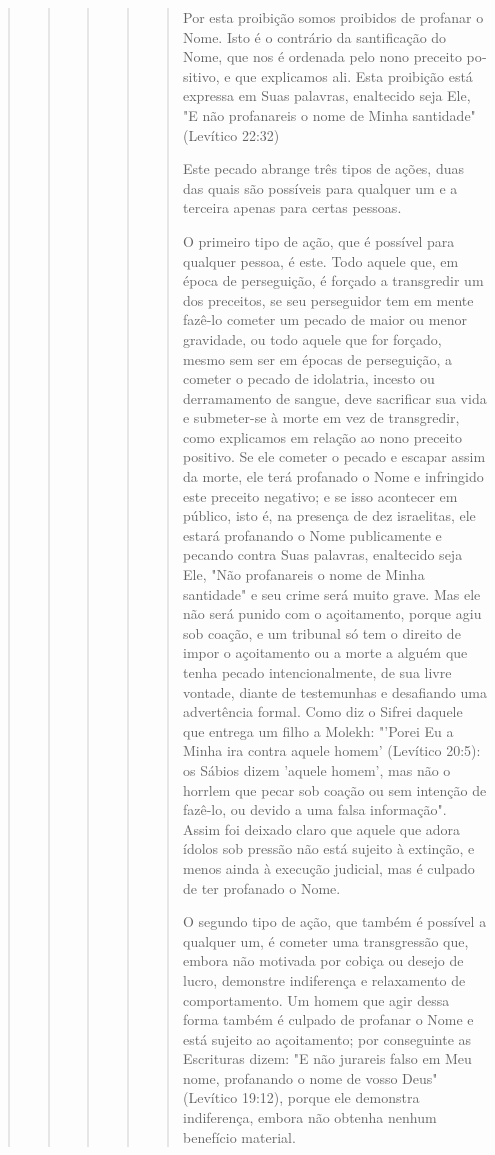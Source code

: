 \begin{quote}
\begin{quote}
\begin{quote}
\begin{quote}
\begin{quote}
Por esta proibição somos proibidos de profanar o Nome. Isto é o
contrário da santificação do Nome, que nos é ordenada pelo nono preceito
po­sitivo, e que explicamos ali. Esta proibição está expressa em Suas
palavras, enal­tecido seja Ele, "E não profanareis o nome de Minha
santidade" (Levítico 22:32)

Este pecado abrange três tipos de ações, duas das quais são possí­veis
para qualquer um e a terceira apenas para certas pessoas.

O primeiro tipo de ação, que é possível para qualquer pessoa, é es­te.
Todo aquele que, em época de perseguição, é forçado a transgredir um dos
preceitos, se seu perseguidor tem em mente fazê-lo cometer um pecado de
maior ou menor gravidade, ou todo aquele que for forçado, mesmo sem ser
em épo­cas de perseguição, a cometer o pecado de idolatria, incesto ou
derramamento de sangue, deve sacrificar sua vida e submeter-se à morte
em vez de transgre­dir, como explicamos em relação ao nono preceito
positivo. Se ele cometer o pecado e escapar assim da morte, ele terá
profanado o Nome e infringido este preceito negativo; e se isso
acontecer em público, isto é, na presença de dez israelitas, ele estará
profanando o Nome publicamente e pecando contra Suas palavras,
enaltecido seja Ele, "Não profanareis o nome de Minha santidade" e seu
crime será muito grave. Mas ele não será punido com o açoitamento,
por­que agiu sob coação, e um tribunal só tem o direito de impor o
açoitamento ou a morte a alguém que tenha pecado intencionalmente, de
sua livre vontade, diante de testemunhas e desafiando uma advertência
formal. Como diz o Sifrei daquele que entrega um filho a Molekh: "'Porei
Eu a Minha ira contra aquele homem' (Levítico 20:5): os Sábios dizem
'aquele homem', mas não o horrlem que pecar sob coação ou sem intenção
de fazê-lo, ou devido a uma falsa infor­mação". Assim foi deixado claro
que aquele que adora ídolos sob pressão não está sujeito à extinção, e
menos ainda à execução judicial, mas é culpado de ter profanado o Nome.

O segundo tipo de ação, que também é possível a qualquer um, é cometer
uma transgressão que, embora não motivada por cobiça ou desejo de lucro,
demonstre indiferença e relaxamento de comportamento. Um homem que agir
dessa forma também é culpado de profanar o Nome e está sujeito ao
açoitamento; por conseguinte as Escrituras dizem: "E não jurareis falso
em Meu nome, profanando o nome de vosso Deus" (Levítico 19:12), porque
ele demons­tra indiferença, embora não obtenha nenhum benefício
material.


\end{quote}
\end{quote}
\end{quote}
\end{quote}
\end{quote}
